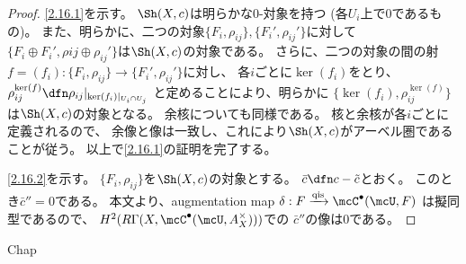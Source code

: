 \documentclass[uplatex,dvipdfmx]{jsarticle}
\begin{document}
\begin{proof}
  \ref{2.16.1}を示す。
  \(\Sh(X,c)\)は明らかな\(0\)-対象を持つ
  (各\(U_i\)上で\(0\)であるもの)。
  また、明らかに、二つの対象\(\{F_i,\rho_{ij}\},\{F_i',\rho_{ij}'\}\)に対して
  \(\{F_i\oplus F_i',\rho{ij}\oplus \rho_{ij}'\}\)は\(\Sh(X,c)\)の対象である。
  さらに、二つの対象の間の射\(f=(f_i):\{F_i,\rho_{ij}\}\to\{F_i',\rho_{ij}'\}\)に対し、
  各\(i\)ごとに\(\ker(f_i)\)をとり、
  \(\rho^{\ker(f)}_{ij}\dfn \rho_{ij}|_{\ker(f_i)|_{U_i\cap U_j}}\)
  と定めることにより、明らかに
  \(\{\ker(f_i),\rho^{\ker(f)}_{ij}\}\)は\(\Sh(X,c)\)の対象となる。
  余核についても同様である。
  核と余核が各\(i\)ごとに定義されるので、
  余像と像は一致し、これにより\(\Sh(X,c)\)がアーベル圏であることが従う。
  以上で\ref{2.16.1}の証明を完了する。

  \ref{2.16.2}を示す。
  \(\{F_i,\rho_{ij}\}\)を\(\Sh(X,c)\)の対象とする。
  \(\bar{c} \dfn c-\tilde{c}\)とおく。
  このとき\(\bar{c}''=0\)である。
  本文\cite[Proposition 2.8.4]{kashiwara2002sheaves}より、augmentation map
  \(\delta:F\xrightarrow{\text{qis}} \mcC^{\bullet}(\mcU,F)\)
  は擬同型であるので、
  \(H^2(R\Gamma(X,\mcC^{\bullet}(\mcU,A_X^{\times})))\)での
  \(\bar{c}''\)の像は\(0\)である。
\end{proof}







\ifcsname Chap\endcsname\else
\printbibliography
\end{document}
